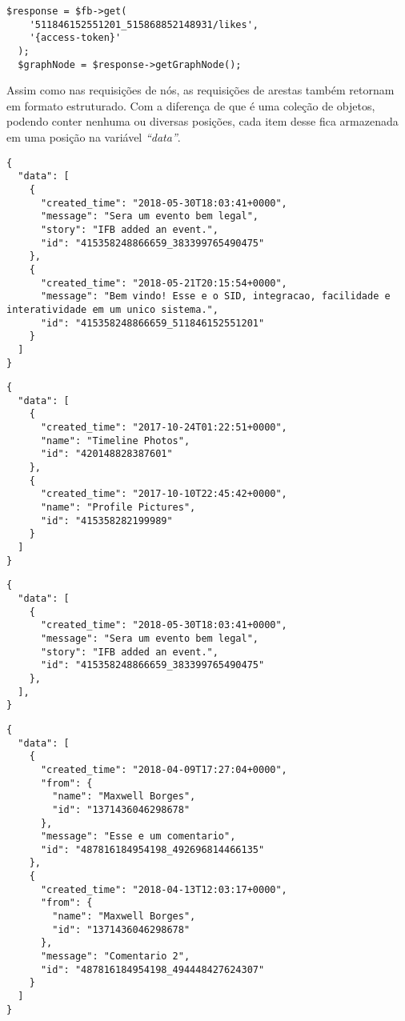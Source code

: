 \begin{lstlisting}[caption={Requisitar todas as curtidas de um comentário},label={lst:curtidasComentario}]
  $response = $fb->get( 
    '511846152551201_515868852148931/likes', 
    '{access-token}'
  );
  $graphNode = $response->getGraphNode();
\end{lstlisting}

Assim como nas requisições de nós, as requisições de arestas também retornam em formato estruturado. Com a diferença de que é uma coleção de objetos, podendo conter nenhuma ou diversas posições, cada item desse fica armazenada em uma posição na variável \textit{``data''}.

\begin{lstlisting}[caption={Resposta da requisição \ref{lst:feedUsuario} (Feed)},label={lst:respostaFeed}]
{
  "data": [
    {
      "created_time": "2018-05-30T18:03:41+0000",
      "message": "Sera um evento bem legal",
      "story": "IFB added an event.",
      "id": "415358248866659_383399765490475"
    },
    {
      "created_time": "2018-05-21T20:15:54+0000",
      "message": "Bem vindo! Esse e o SID, integracao, facilidade e interatividade em um unico sistema.",
      "id": "415358248866659_511846152551201"
    }
  ]
}
\end{lstlisting} 

\begin{lstlisting}[caption={Resposta das requisições \ref{lst:albunsPagina}, \ref{lst:fotosPagina} e \ref{lst:videosPagina}  (Álbuns, Fotos e Videos)},label={lst:respostaAlbuns}]
{
  "data": [
    {
      "created_time": "2017-10-24T01:22:51+0000",
      "name": "Timeline Photos",
      "id": "420148828387601"
    },
    {
      "created_time": "2017-10-10T22:45:42+0000",
      "name": "Profile Pictures",
      "id": "415358282199989"
    }
  ]
}
\end{lstlisting}

\begin{lstlisting}[caption={Resposta da requisição \ref{lst:eventosPagina} (Eventos)},label={lst:respostaEventos}]
{
  "data": [
    {
      "created_time": "2018-05-30T18:03:41+0000",
      "message": "Sera um evento bem legal",
      "story": "IFB added an event.",
      "id": "415358248866659_383399765490475"
    },
  ],
}
\end{lstlisting} 

\begin{lstlisting}[caption={Resposta da requisição \ref{lst:comentariosPostagem} (Comentários)},label={lst:respostaComentarios}]
{
  "data": [
    {
      "created_time": "2018-04-09T17:27:04+0000",
      "from": {
        "name": "Maxwell Borges",
        "id": "1371436046298678"
      },
      "message": "Esse e um comentario",
      "id": "487816184954198_492696814466135"
    },
    {
      "created_time": "2018-04-13T12:03:17+0000",
      "from": {
        "name": "Maxwell Borges",
        "id": "1371436046298678"
      },
      "message": "Comentario 2",
      "id": "487816184954198_494448427624307"
    }
  ]
}
\end{lstlisting} 


